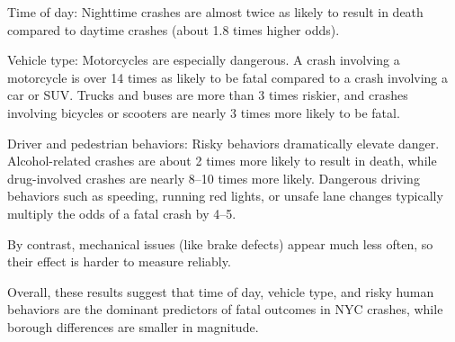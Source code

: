 \documentclass[10pt]{article}\usepackage[]{graphicx}\usepackage[]{xcolor}
\begin{document}
Time of day: Nighttime crashes are almost twice as likely to result in death compared to daytime crashes (about 1.8 times higher odds).

Vehicle type: Motorcycles are especially dangerous. A crash involving a motorcycle is over 14 times as likely to be fatal compared to a crash involving a car or SUV. Trucks and buses are more than 3 times riskier, and crashes involving bicycles or scooters are nearly 3 times more likely to be fatal.

Driver and pedestrian behaviors: Risky behaviors dramatically elevate danger. Alcohol-related crashes are about 2 times more likely to result in death, while drug-involved crashes are nearly 8–10 times more likely. Dangerous driving behaviors such as speeding, running red lights, or unsafe lane changes typically multiply the odds of a fatal crash by 4–5.

By contrast, mechanical issues (like brake defects) appear much less often, so their effect is harder to measure reliably.

Overall, these results suggest that time of day, vehicle type, and risky human behaviors are the dominant predictors of fatal outcomes in NYC crashes, while borough differences are smaller in magnitude.
\end{document}
